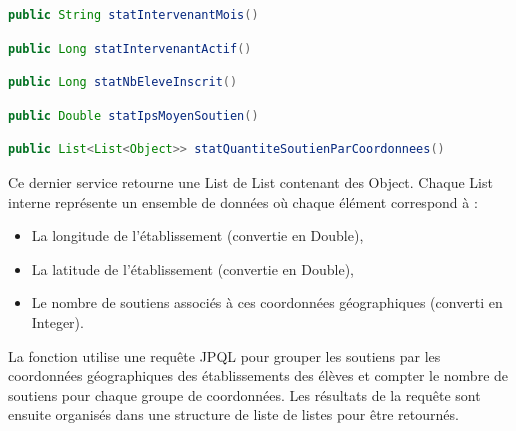 \begin{lstlisting}[language = Java]
public String statIntervenantMois()
\end{lstlisting}

\begin{lstlisting}[language = Java]
public Long statIntervenantActif()
\end{lstlisting}

\begin{lstlisting}[language = Java]
public Long statNbEleveInscrit()
\end{lstlisting}

\begin{lstlisting}[language = Java]
public Double statIpsMoyenSoutien()
\end{lstlisting}

\begin{lstlisting}[language = Java]
public List<List<Object>> statQuantiteSoutienParCoordonnees()
\end{lstlisting}

Ce dernier service retourne une List de List contenant des Object. Chaque List interne représente un ensemble de données où chaque élément correspond à :
\begin{itemize}
    \item La longitude de l'établissement (convertie en Double),
    \item La latitude de l'établissement (convertie en Double),
    \item Le nombre de soutiens associés à ces coordonnées géographiques (converti en Integer).
\end{itemize}
La fonction utilise une requête JPQL pour grouper les soutiens par les coordonnées géographiques des établissements des élèves et compter le nombre de soutiens pour chaque groupe de coordonnées. Les résultats de la requête sont ensuite organisés dans une structure de liste de listes pour être retournés.
